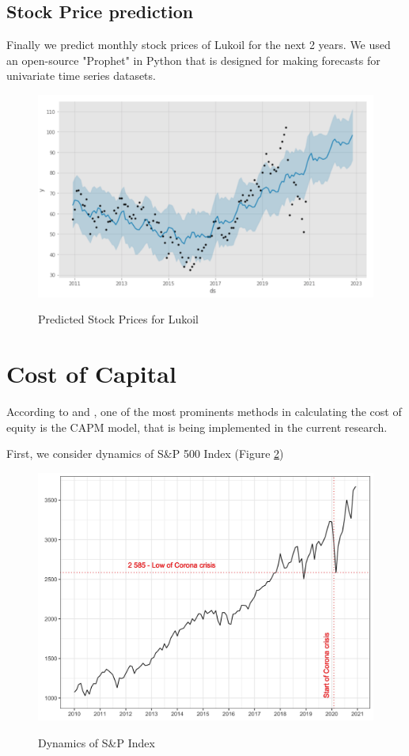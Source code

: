 \documentclass [a4paper, 11pt] {article}
\begin{document}
\subsection {Stock Price prediction}
Finally we predict monthly stock prices of Lukoil for the next 2 years. We used an open-source "Prophet" in Python that is designed for making forecasts for univariate time series datasets.

\begin{figure}[h]
\caption{Predicted Stock Prices for Lukoil}
\includegraphics[scale=0.65]{Predicted}
\label{fig:graph}
\end{figure}

\clearpage


\section {Cost of Capital}
According to \cite{DamodaranDark} and \cite{BestPract}, one of the most prominents methods in calculating the cost of equity is the CAPM model, that is being implemented in the current research.

First, we consider dynamics of S\&P 500 Index (Figure \ref{fig:sandp})

\begin{figure}[h]
\caption{Dynamics of S\&P Index}
\includegraphics[scale=0.17]{sandp}
\label{fig:sandp}
\end{figure}
\end{document}

